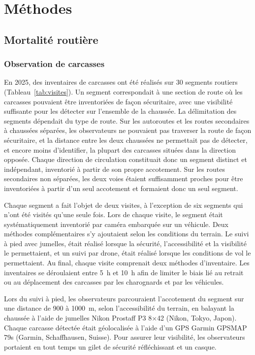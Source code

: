 
\section{Méthodes}

\subsection{Mortalité routière}

\subsubsection{Observation de carcasses}

En 2025, des inventaires de carcasses ont été réalisés sur 30 segments routiers (Tableau~\ref{tab:visites}). Un segment correspondait à une section de route où les carcasses pouvaient être inventoriées de façon sécuritaire, avec une visibilité suffisante pour les détecter sur l'ensemble de la chaussée. La délimitation des segments dépendait du type de route. Sur les autoroutes et les routes secondaires à chaussées séparées, les observateurs ne pouvaient pas traverser la route de façon sécuritaire, et la distance entre les deux chaussées ne permettait pas de détecter, et encore moins d'identifier, la plupart des carcasses situées dans la direction opposée. Chaque direction de circulation constituait donc un segment distinct et indépendant, inventorié à partir de son propre accotement. Sur les routes secondaires non séparées, les deux voies étaient suffisamment proches pour être inventoriées à partir d'un seul accotement et formaient donc un seul segment.

Chaque segment a fait l'objet de deux visites, à l'exception de six segments qui n'ont été visités qu'une seule fois. Lors de chaque visite, le segment était systématiquement inventorié par caméra embarquée sur un véhicule. Deux méthodes complémentaires s'y ajoutaient selon les conditions du terrain. Le suivi à pied avec jumelles, était réalisé lorsque la sécurité, l'accessibilité et la visibilité le permettaient, et un suivi par drone, était réalisé lorsque les conditions de vol le permettaient. Au final, chaque visite comprenait deux méthodes d'inventaire. Les inventaires se déroulaient entre 5~h et 10~h afin de limiter le biais lié au retrait ou au déplacement des carcasses par les charognards et par les véhicules.

Lors du suivi à pied, les observateurs parcouraient l'accotement du segment sur une distance de 900 à 1000~m, selon l'accessibilité du terrain, en balayant la chaussée à l'aide de jumelles Nikon Prostaff P3 8$\times$42 (Nikon, Tokyo, Japon). Chaque carcasse détectée était géolocalisée à l'aide d'un GPS Garmin GPSMAP 79s (Garmin, Schaffhausen, Suisse). Pour assurer leur visibilité, les observateurs portaient en tout temps un gilet de sécurité réfléchissant et un casque.

